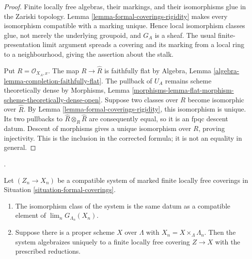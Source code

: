 \begin{proof}
Finite locally free algebras, their markings, and their isomorphisms glue in
the Zariski topology. Lemma \ref{lemma-formal-coverings-rigidity} makes every
isomorphism compatible with a marking unique. Hence local isomorphism classes
glue, not merely the underlying groupoid, and $G_A$ is a sheaf. The usual
finite-presentation limit argument spreads a covering and its marking from a
local ring to a neighbourhood, giving the assertion about the stalk.

Put $R = \mathcal{O}_{X_A,x}$. The map $R \to \widehat R$ is faithfully flat
by Algebra, Lemma \ref{algebra-lemma-completion-faithfully-flat}. The pullback
of $U_A$ remains scheme theoretically dense by Morphisms, Lemma
\ref{morphisms-lemma-flat-morphism-scheme-theoretically-dense-open}. Suppose
two classes over $R$ become isomorphic over $\widehat R$. By Lemma
\ref{lemma-formal-coverings-rigidity}, this isomorphism is unique. Its two
pullbacks to $\widehat R \otimes_R \widehat R$ are consequently equal, so it
is an fpqc descent datum. Descent of morphisms gives a unique isomorphism over
$R$, proving injectivity. This is the inclusion in the corrected formula; it
is not an equality in general.
\end{proof}




\begin{lemma}
\label{lemma-formal-coverings-limit-algebraize}
\begin{reference}
\cite[Expos\'e 195, C, Section 5, p. 388]{FGA}.
\end{reference}
Let $(Z_n \to X_n)$ be a compatible system of marked finite locally free
coverings in Situation \ref{situation-formal-coverings}.
\begin{enumerate}
\item The isomorphism class of the system is the same datum as a compatible
element of $\lim_n G_{\Lambda_n}(X_n)$.
\item Suppose there is a proper scheme $X$ over $\Lambda$ with
$X_n = X \times_\Lambda \Lambda_n$. Then the system algebraizes uniquely to
a finite locally free covering $Z \to X$ with the prescribed reductions.
\end{enumerate}
\end{lemma}

